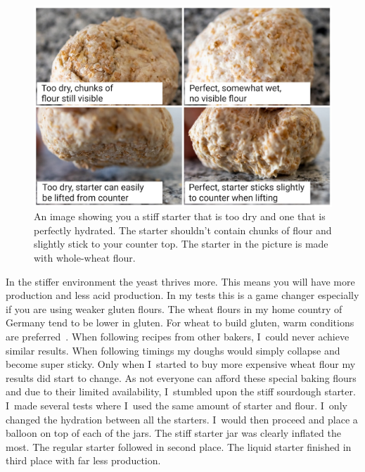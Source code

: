 \begin{figure}[!htb]
  \includegraphics[width=\textwidth]{stiff-starter-dry-check.jpg}
  \caption[Too dry and perfectly hydrated stiff starter]{An image showing you a
      stiff starter that is too dry and one that is perfectly hydrated.  The
      starter shouldn't contain chunks of flour and slightly stick to your
      counter top. The starter in the picture is made with whole-wheat flour.}%
  \label{fig:stiff-starter-dry-check}
\end{figure}

\begin{flowchart}[!htb]
\centering
  
  \caption[Converting to a stiff starter]{The process to convert your regular
      starter into a stiff starter. The whole process takes around 3 days. The
      longer you maintain your starter at the suggested hydration level, the
      more adapted your microorganisms become. The stiff starter boosts the
      yeast activity of your sourdough starter.  The guide uses a
      \qty{50}{\percent} hydration level for the starter. If the dough is too
      stiff consider increasing this to \qty{60}{\percent}.}%
  \label{fig:stiff-starter-conversion}
\end{flowchart}

In the stiffer environment the yeast thrives more. This means you will have
more  production and less acid production. In my tests this is a game
changer especially if you are using weaker gluten flours. The wheat flours in
my home country of Germany tend to be lower in gluten. For wheat to build gluten, warm conditions
are preferred~\cite{gluten+development+temperatures}. When following recipes
from other bakers, I~could never achieve similar results. When following
timings my doughs would
simply collapse and become super sticky. Only when I~started to buy more
expensive wheat flour my results did start to change. As not everyone can afford
these special baking flours and due to their limited availability, I~stumbled upon the
stiff sourdough starter. I~made several tests where I~used the same amount of
starter and flour. I~only changed the hydration between all the starters.
I~would then proceed and place a balloon on top of each of the jars. The stiff
starter jar was clearly inflated the most. The regular starter
followed in second place. The liquid starter finished in third place with far less 
production.

